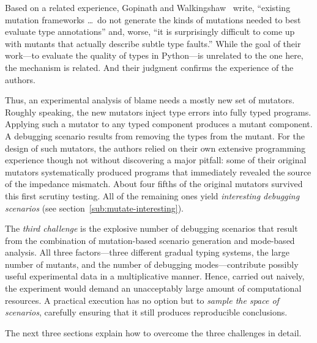 Based on a related experience, Gopinath and Walkingshaw~\cite{gw-mutation} write,
``existing mutation frameworks \ldots\ do not generate the kinds of mutations
needed to best evaluate type annotations'' and, worse, ``it is surprisingly
difficult to come up with mutants that actually describe subtle type faults.''
While the goal of their work---to evaluate the quality of types in
Python---is unrelated to the one here, the mechanism is related. And their
judgment confirms the experience of the authors. 

Thus, an experimental analysis of blame needs a mostly new set of mutators.
Roughly speaking, the new mutators inject type errors into fully typed programs.
Applying such a mutator to any typed component produces a mutant component.  A
debugging scenario results from removing the types from the mutant. For the
design of such mutators, the authors relied on their own extensive programming
experience though not without discovering a major pitfall: some of their
original mutators systematically produced programs that immediately revealed the
source of the impedance mismatch. About four fifths of the original mutators
survived this first scrutiny testing. All of the remaining ones yield {\em
interesting debugging scenarios\/} (see section~\ref{sub:mutate-interesting}).

The {\em third challenge\/} is the explosive number of debugging scenarios that
result from the combination of mutation-based scenario generation and mode-based
analysis. All three factors---three different gradual typing systems, the large
number of mutants, and the number of debugging modes---contribute possibly
useful experimental data in a multiplicative manner. Hence, carried out naively,
the experiment would demand an unacceptably large amount of computational
resources.  A practical execution has no option but to {\em sample the space of
scenarios\/}, carefully ensuring that it still produces reproducible
conclusions.

The next three sections explain how to overcome the three challenges
in detail. 

